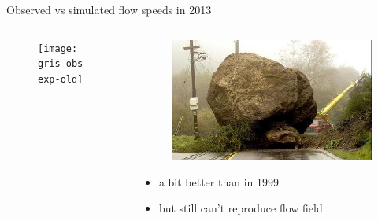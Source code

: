 \documentclass[hide notes,intlimits]{beamer}
\begin{document}
\begin{frame}{Observed vs simulated flow speeds in 2013}
  \begin{columns}[c]
    \begin{column}{.65\linewidth}
    \begin{figure}
      \texttt{[image: gris-obs-exp-old]}
    \end{figure}
    \end{column}
    \begin{column}{.35\linewidth}
      \begin{figure}
        \includegraphics[width=\textwidth]{roadblocks}
      \end{figure}
      \begin{itemize}
      \item a bit better than in 1999
      \item but still can't reproduce flow field
      \end{itemize}
    \end{column}
  \end{columns}
  \note[item]{}
\end{frame}
\end{document}
